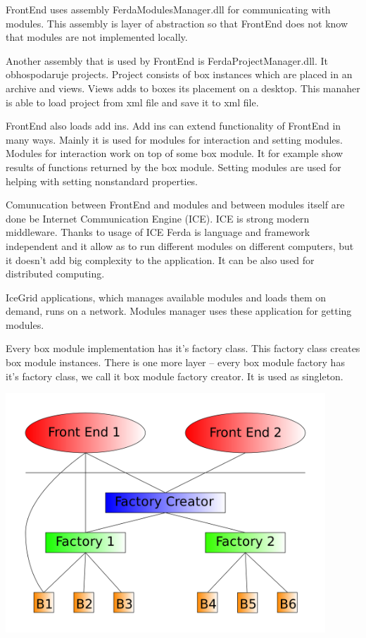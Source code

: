 \documentclass[a4paper,12pt]{book}
\begin{document}
FrontEnd uses assembly FerdaModulesManager.dll for communicating with modules. This assembly is layer of abstraction so that FrontEnd does not know that modules are not implemented locally.

Another assembly that is used by FrontEnd is FerdaProjectManager.dll. It obhospodaruje projects. Project consists of box instances which are placed in an archive and views. Views adds to boxes its placement on a desktop. This manaher is able to load project from xml file and save it to xml file.

FrontEnd also loads add ins. Add ins can extend functionality of FrontEnd in many ways. Mainly it is used for modules for interaction and setting modules. Modules for interaction work on top of some box module. It for example show results of functions returned by the box module. Setting modules are used for helping with setting nonstandard properties.

Comunucation between FrontEnd and modules and between modules itself are done be Internet Communication Engine (ICE). ICE is strong modern middleware. Thanks to usage of ICE Ferda is language and framework independent and it allow as to run different modules on different computers, but it doesn't add big complexity to the application. It can be also used for distributed computing.

IceGrid applications, which manages available modules and loads them on demand, runs on a network. Modules manager uses these application for getting modules.

Every box module implementation has it's factory class. This factory class creates box module instances. There is one more layer -- every box module factory has it's factory class, we call it box module factory creator. It is used as singleton.

\noindent\includegraphics[width=12cm]{creatorFactory}
\end{document}
